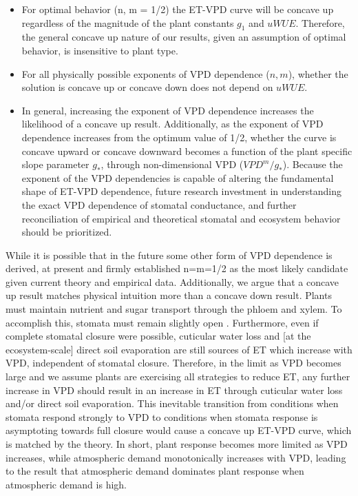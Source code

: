 \begin{itemize}
  \item For optimal behavior (n, m = 1/2) the ET-VPD curve will be
    concave up regardless of the magnitude of the plant constants
    $g_1$ and $uWUE$. Therefore, the general concave up nature of our
    results, given an assumption of optimal behavior, is insensitive
    to plant type.
  \item For all physically possible exponents of VPD dependence ($n,
    m$), whether the solution is concave up or concave down does not
    depend on $uWUE$.
  \item In general, increasing the exponent of VPD dependence
    increases the likelihood of a concave up result. Additionally, as
    the exponent of VPD dependence increases from the optimum value of
    1/2, whether the curve is concave upward or concave downward
    becomes a function of the plant specific slope parameter $g_*$,
    through non-dimensional VPD ($VPD^m/g_*$). Because the exponent of
    the VPD dependencies is capable of altering the fundamental shape
    of ET-VPD dependence, future research investment in understanding
    the exact VPD dependence of stomatal conductance, and further
    reconciliation of empirical and theoretical stomatal and
    ecosystem behavior should be prioritized.
\end{itemize}
While it is possible that in the future some other form of
VPD dependence is derived, at present \cite{MEDLYN_2011} and
\cite{Zhou_2014} firmly established n=m=1/2 as the most likely
candidate given current theory and empirical data. Additionally, we
argue that a concave up result matches physical intuition more than a
concave down result. Plants must maintain nutrient and sugar transport
through the phloem and xylem. To accomplish this, stomata must remain
slightly open \citep{De_2013, Nikinmaa_2013, Ryan_2014}. Furthermore,
even if complete stomatal closure were possible, cuticular water loss
and [at the ecosystem-scale] direct soil evaporation are still sources
of ET which increase with VPD, independent of stomatal
closure. Therefore, in the limit as VPD becomes large and we assume
plants are exercising all strategies to reduce ET, any further increase
in VPD should result in an increase in ET through cuticular water loss
and/or direct soil evaporation. This inevitable transition from
conditions when stomata respond strongly to VPD to conditions when
stomata response is asymptoting towards full closure would cause a
concave up ET-VPD curve, which is matched by the theory. In short,
plant response becomes more limited as VPD increases, while
atmospheric demand monotonically increases with VPD, leading to the
 result that atmospheric demand dominates plant response when
atmospheric demand is high.

